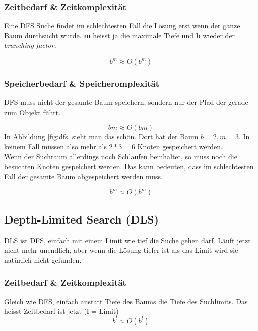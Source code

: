 \subsubsection{Zeitbedarf \& Zeitkomplexität}
Eine DFS Suche findet im schlechtesten Fall die Lösung erst wenn der ganze Baum durchsucht wurde. \textbf{m} heisst ja die maximale Tiefe und \textbf{b} wieder der \textit{branching factor.}

\begin{displaymath}
	b^m \approx O(b^m)
\end{displaymath}

\subsubsection{Speicherbedarf \& Speicheromplexität}
DFS muss nicht der gesamte Baum speichern, sondern nur der Pfad der gerade zum Objekt führt.

\begin{displaymath}
bm \approx O(bm)
\end{displaymath}
In Abbildung \ref{fig:dfs} sieht man das schön. Dort hat der Baum \(b=2, m=3\). In keinem Fall müssen also mehr als \(2*3=6\) Knoten gespeichert werden. \\ \newline
Wenn der Suchraum allerdings noch Schlaufen beinhaltet, so muss noch die besuchten Knoten gespeichert werden. Das kann bedeuten, dass im schlechtesten Fall der gesamte Baum abgespeichert werden muss.

\begin{displaymath}
b^m \approx O(b^m)
\end{displaymath}

\subsection{Depth-Limited Search (DLS)}
DLS ist DFS, einfach mit einem Limit wie tief die Suche gehen darf. Läuft jetzt nicht mehr unendlich, aber wenn die Lösung tiefer ist als das Limit wird sie natürlich nicht gefunden.
\subsubsection{Zeitbedarf \& Zeitkomplexität}
Gleich wie DFS, einfach anstatt Tiefe des Baums die Tiefe des Suchlimits. Das heisst Zeitbedarf ist jetzt (\textbf{l} = Limit)
\begin{displaymath}
b^l \approx O(b^l)
\end{displaymath}
